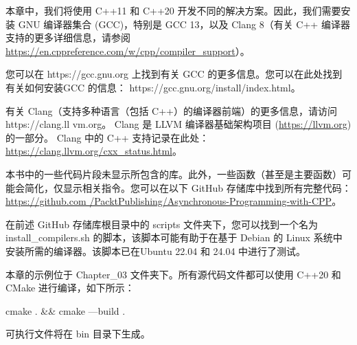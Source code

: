 
本章中，我们将使用 C++11 和 C++20 开发不同的解决方案。因此，我们需要安装 GNU 编译器集合 (GCC)，特别是 GCC 13，以及 Clang 8（有关 C++ 编译器支持的更多详细信息，请参阅 \url{https://en.cppreference.com/w/cpp/compiler_support}）。

您可以在 https://gcc.gnu.org 上找到有关 GCC 的更多信息。您可以在此处找到有关如何安装GCC 的信息： https://gcc.gnu.org/install/index.html。

有关 Clang（支持多种语言（包括 C++）的编译器前端）的更多信息，请访问 https://clang.ll vm.org。 Clang 是 LLVM 编译器基础架构项目 (\url{https://llvm.org}) 的一部分。 Clang 中的 C++ 支持记录在此处： \url{https://clang.llvm.org/cxx_status.html}。

本书中的一些代码片段未显示所包含的库。此外，一些函数（甚至是主要函数）可能会简化，仅显示相关指令。您可以在以下 GitHub 存储库中找到所有完整代码： \url{https://github.com /PacktPublishing/Asynchronous-Programming-with-CPP}。

在前述 GitHub 存储库根目录中的 scripts 文件夹下，您可以找到一个名为 install\_compilers.sh 的脚本，该脚本可能有助于在基于 Debian 的 Linux 系统中安装所需的编译器。该脚本已在Ubuntu 22.04 和 24.04 中进行了测试。

本章的示例位于 Chapter\_03 文件夹下。所有源代码文件都可以使用 C++20 和 CMake 进行编译，如下所示：

\begin{shell}
cmake . && cmake —build .
\end{shell}

可执行文件将在 bin 目录下生成。


